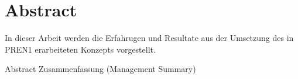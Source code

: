 \section*{Abstract}

In dieser Arbeit werden die Erfahrugen und Resultate aus der Umsetzung des in PREN1 erarbeiteten Konzepts vorgestellt. 


Abstract
Zusammenfassung (Management Summary)